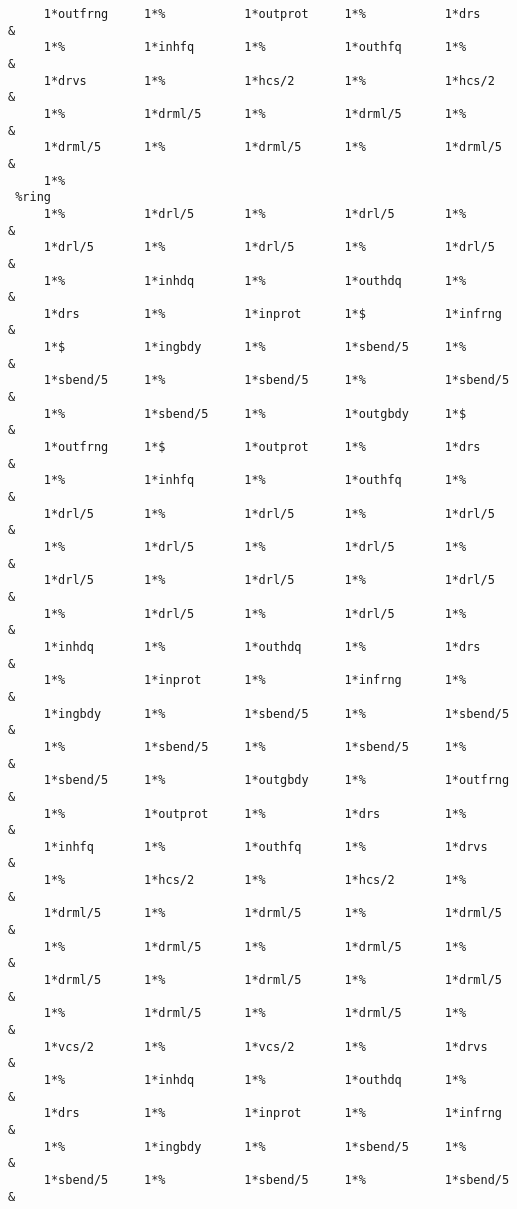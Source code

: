 \begin{footnotesize}
\begin{verbatim}
     1*outfrng     1*%           1*outprot     1*%           1*drs      &
     1*%           1*inhfq       1*%           1*outhfq      1*%        &
     1*drvs        1*%           1*hcs/2       1*%           1*hcs/2    &
     1*%           1*drml/5      1*%           1*drml/5      1*%        &
     1*drml/5      1*%           1*drml/5      1*%           1*drml/5   &
     1*%
 %ring
     1*%           1*drl/5       1*%           1*drl/5       1*%        &
     1*drl/5       1*%           1*drl/5       1*%           1*drl/5    &
     1*%           1*inhdq       1*%           1*outhdq      1*%        &
     1*drs         1*%           1*inprot      1*$           1*infrng   &
     1*$           1*ingbdy      1*%           1*sbend/5     1*%        &
     1*sbend/5     1*%           1*sbend/5     1*%           1*sbend/5  &
     1*%           1*sbend/5     1*%           1*outgbdy     1*$        &
     1*outfrng     1*$           1*outprot     1*%           1*drs      &
     1*%           1*inhfq       1*%           1*outhfq      1*%        &
     1*drl/5       1*%           1*drl/5       1*%           1*drl/5    &
     1*%           1*drl/5       1*%           1*drl/5       1*%        &
     1*drl/5       1*%           1*drl/5       1*%           1*drl/5    &
     1*%           1*drl/5       1*%           1*drl/5       1*%        &
     1*inhdq       1*%           1*outhdq      1*%           1*drs      &
     1*%           1*inprot      1*%           1*infrng      1*%        &
     1*ingbdy      1*%           1*sbend/5     1*%           1*sbend/5  &
     1*%           1*sbend/5     1*%           1*sbend/5     1*%        &
     1*sbend/5     1*%           1*outgbdy     1*%           1*outfrng  &
     1*%           1*outprot     1*%           1*drs         1*%        &
     1*inhfq       1*%           1*outhfq      1*%           1*drvs     &
     1*%           1*hcs/2       1*%           1*hcs/2       1*%        &
     1*drml/5      1*%           1*drml/5      1*%           1*drml/5   &
     1*%           1*drml/5      1*%           1*drml/5      1*%        &
     1*drml/5      1*%           1*drml/5      1*%           1*drml/5   &
     1*%           1*drml/5      1*%           1*drml/5      1*%        &
     1*vcs/2       1*%           1*vcs/2       1*%           1*drvs     &
     1*%           1*inhdq       1*%           1*outhdq      1*%        &
     1*drs         1*%           1*inprot      1*%           1*infrng   &
     1*%           1*ingbdy      1*%           1*sbend/5     1*%        &
     1*sbend/5     1*%           1*sbend/5     1*%           1*sbend/5  &

\end{verbatim}
\end{footnotesize}

